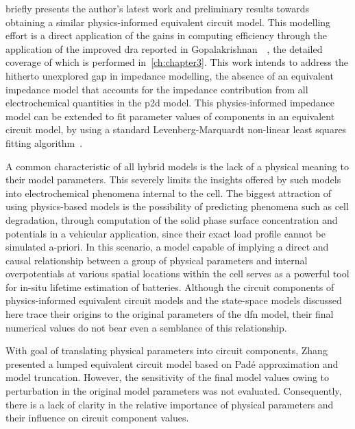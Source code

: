   briefly presents  the author's  latest work  and preliminary
results towards  obtaining a similar physics-informed  equivalent circuit model.
This  modelling  effort is  a  direct  application  of  the gains  in  computing
efficiency  through  the  application  of the  improved  \gls{dra}  reported  in
Gopalakrishnan~\etal{}~\cite{Gopalakrishnan2017},   the  detailed   coverage  of
which  is performed  in~\cref{ch:chapter3}.  This work  intends  to address  the
hitherto  unexplored  gap  in  impedance  modelling, \ie{}  the  absence  of  an
equivalent impedance  model that  accounts for  the impedance  contribution from
all  electrochemical quantities  in the  \gls{p2d} model.  This physics-informed
impedance  model can  be  extended  to fit  parameter  values  of components  in
an  equivalent circuit  model,  \eg{} by  using  a standard  Levenberg-Marquardt
non-linear least squares fitting algorithm~\cite{Levenberg1944, Marquardt1963}.


A common characteristic of  all hybrid models is the lack  of a physical meaning
to their  model parameters. This  severely limits  the insights offered  by such
models  into  electrochemical  phenomena  internal  to  the  cell.  The  biggest
attraction  of  using physics-based  models  is  the possibility  of  predicting
phenomena such as cell degradation, \eg{} through computation of the solid phase
surface concentration  and potentials  in a  vehicular application,  since their
exact  load profile  cannot be  simulated a-priori.  In this  scenario, a  model
capable of implying a direct and causal relationship between a group of physical
parameters and internal  overpotentials at various spatial  locations within the
cell serves  as a powerful  tool for  in-situ lifetime estimation  of batteries.
Although the  circuit components  of physics-informed equivalent  circuit models
and the  state-space models discussed here  trace their origins to  the original
parameters of  the \gls{dfn}  model, their  final numerical  values do  not bear
even a  semblance of this relationship.


With  goal   of  translating   physical  parameters  into   circuit  components,
Zhang~\etal{}~\cite{Zhang2017} presented a lumped equivalent circuit model based
on Padé  approximation and  model truncation. However,  the sensitivity  of the
final model  values owing to perturbation  in the original model  parameters was
not  evaluated.  Consequently, there  is  a  lack  of  clarity in  the  relative
importance  of physical  parameters  and their  influence  on circuit  component
values.


